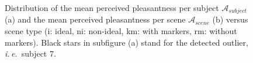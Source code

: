 \documentclass[12pt]{elsarticle}
\newcommand{\ie}{\emph{i.\,e.}}
\newcommand{\cf}{cf.}
\newcommand{\myfloatalign}{\centering}
\begin{document}
\begin{figure}[t]
        \myfloatalign
        \caption{Distribution of the mean perceived pleasantness per subject $\mathcal{A}_{subject}$ (a) and the mean perceived pleasantness per scene $\mathcal{A}_{scene}$ (b) versus scene type (i: ideal, ni: non-ideal, km: with markers, rm: without markers). Black stars in subfigure (a) stand for the detected outlier, \ie~subject 7.}\label{fig:xp2A}
\end{figure}


\end{document}
